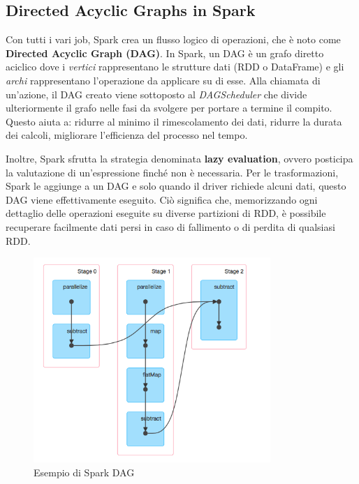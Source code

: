 \subsection{Directed Acyclic Graphs in Spark}
Con tutti i vari job, Spark crea un flusso logico di operazioni, che è noto come \textbf{Directed Acyclic Graph (DAG)}. In Spark, un DAG è un grafo diretto aciclico dove i \textit{vertici} rappresentano le strutture dati (RDD o DataFrame) e gli \textit{archi} rappresentano l'operazione da applicare su di esse. Alla chiamata di un'azione, il DAG creato viene sottoposto al \textit{DAGScheduler} che divide ulteriormente il grafo nelle fasi da svolgere per portare a termine il compito. Questo aiuta a: ridurre al minimo il rimescolamento dei dati, ridurre la durata dei calcoli, migliorare l'efficienza del processo nel tempo.

Inoltre, Spark sfrutta la strategia denominata \textbf{lazy evaluation}, ovvero posticipa la valutazione di un'espressione finché non è necessaria. Per le trasformazioni, Spark le aggiunge a un DAG e solo quando il driver richiede alcuni dati, questo DAG viene effettivamente eseguito. Ciò significa che, memorizzando ogni dettaglio delle operazioni eseguite su diverse partizioni di RDD, è possibile recuperare facilmente dati persi in caso di fallimento o di perdita di qualsiasi RDD.
\begin{figure}[hbt!]
    \centering
    \includegraphics[width=0.8\textwidth]{img/sparkdag.png}
    \caption{Esempio di Spark DAG}
    \label{fig:spark_dag}
\end{figure}

